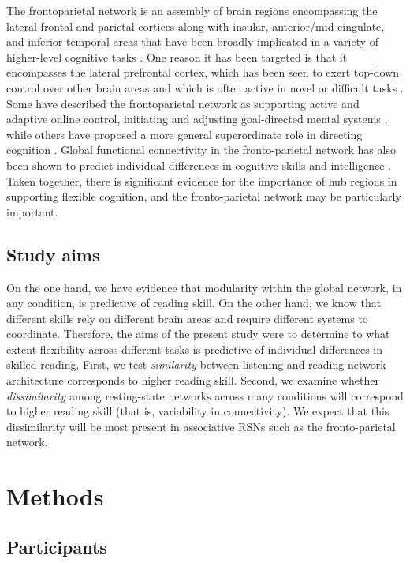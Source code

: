 The frontoparietal network is an assembly of brain regions encompassing the lateral frontal and parietal cortices along with insular, anterior/mid cingulate, and inferior temporal areas that have been broadly implicated in a variety of higher-level cognitive tasks \citep{Fedorenko2013}. One reason it has been targeted is that it encompasses the lateral prefrontal cortex, which has been seen to exert top-down control over other brain areas and which is often active in novel or difficult tasks \citep{Duncan2010}. Some have described the frontoparietal network as supporting active and adaptive online control, initiating and adjusting goal-directed mental systems \citep{Dosenbach2007}, while others have proposed a more general superordinate role in directing cognition \citep{Niendam2012}.  Global functional connectivity in the fronto-parietal network has also been shown to predict individual differences in cognitive skills and intelligence \citep{Cole2011}. Taken together, there is significant evidence for the importance of hub regions in supporting flexible cognition, and the fronto-parietal network may be particularly important. 

\subsection{Study aims}

On the one hand, we have evidence that modularity within the global network, in any condition, is predictive of reading skill. On the other hand, we know that different skills rely on different brain areas and require different systems to coordinate. Therefore, the aims of the present study were to determine to what extent flexibility across different tasks is predictive of individual differences in skilled reading.  First, we test \textit{similarity} between listening and reading network architecture corresponds to higher reading skill. Second, we examine whether \textit{dissimilarity} among resting-state networks across many conditions will correspond to higher reading skill (that is, variability in connectivity). We expect that this dissimilarity will be most present in associative RSNs such as the fronto-parietal network. 


\section{Methods}

\subsection{Participants}

